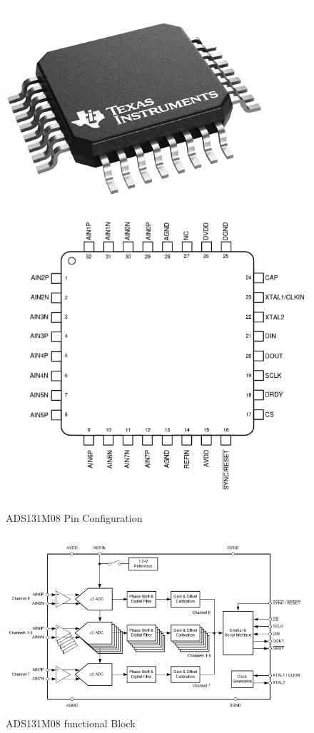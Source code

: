 \begin{figure}[htbp]
\centering
\includegraphics[scale=0.8]{images/ADS131M08 Chip.png}
\includegraphics[scale=0.5]{images/pinoutADC.png}
\caption{ADS131M08 Pin  Configuration}
\label{fig:x ADS131M08 Chip}
\includegraphics[scale=0.7]{images/Block ADC.png}
\caption{ADS131M08 functional Block}
\label{fig:x ADS131M08 Block}
\end{figure}
